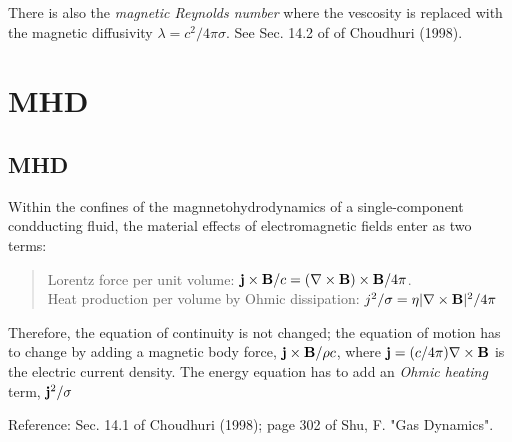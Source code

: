 There is also the \emph{magnetic Reynolds number} where the vescosity is replaced with the magnetic diffusivity \(\lambda = c^2 / 4 \pi \sigma\). See Sec. 14.2 of of Choudhuri (1998).


\section{MHD}

\subsection{MHD}

Within the confines of the magnnetohydrodynamics of a single-component condducting fluid, the material effects of electromagnetic fields enter as two terms:
\begin{quote}
Lorentz force per unit volume: \({\bf j} \times {\bf B} / c = (\nabla \times {\bf B}) \times {\bf B} / 4\pi\).\\
Heat production per volume by Ohmic dissipation: \(j^2 / \sigma = \eta | \nabla \times {\bf B} |^2 / 4\pi\)
\end{quote}

Therefore, the equation of continuity is not changed; the equation of motion has to change by adding a magnetic body force, \({\bf j} \times {\bf B} / \rho c\), where \({\bf j} = (c/4\pi) \nabla \times {\bf B}\)  is the electric current density. The energy equation has to add an \emph{Ohmic heating} term, \({\bf j}^2 / \sigma\)

Reference: Sec. 14.1 of Choudhuri (1998); page 302 of Shu, F. "Gas Dynamics". 

